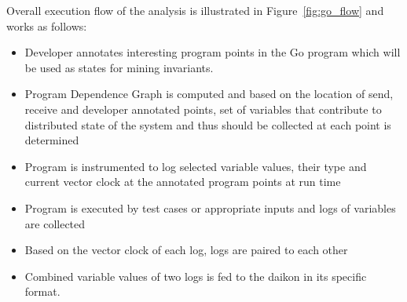 
Overall execution flow of the analysis is illustrated in Figure~\ref{fig:go_flow} and works as follows:
\begin{itemize}
\item Developer annotates interesting program points in the Go program which will be used as states for mining invariants.
\item Program Dependence Graph is computed and based on the location of send, receive and developer annotated points, set of variables that contribute to distributed state of the system and thus should be collected at each point is determined
\item Program is instrumented to log selected variable values, their type and current vector clock at the annotated program points at run time
\item Program is executed by test cases or appropriate inputs and logs of variables are collected
\item Based on the vector clock of each log, logs are paired to each other
\item Combined variable values of two logs is fed to the daikon in its specific format.
\end{itemize}
